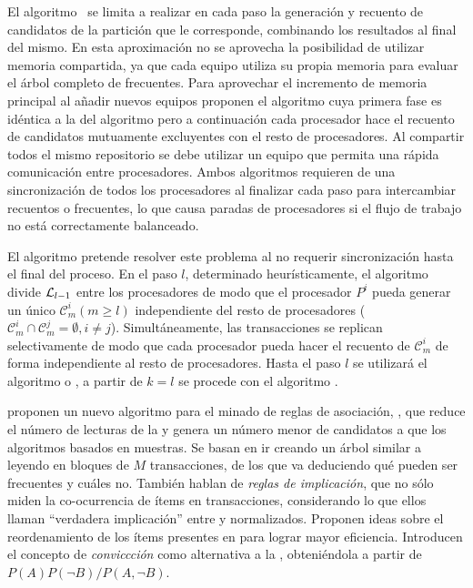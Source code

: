 El algoritmo~%
 se limita a realizar en cada paso la generación y recuento de candidatos de la partición que le corresponde, combinando los resultados al final del mismo. En esta aproximación no se aprovecha la posibilidad de utilizar memoria compartida, ya que cada equipo utiliza su propia memoria para evaluar el árbol completo de \itemsets frecuentes. Para aprovechar el incremento de memoria principal al añadir nuevos equipos proponen el algoritmo  cuya primera fase es idéntica a la del algoritmo  pero a continuación cada procesador hace el recuento de candidatos mutuamente excluyentes con el resto de procesadores. Al compartir todos el mismo repositorio \D se debe utilizar un equipo que permita una rápida comunicación entre procesadores. Ambos algoritmos requieren de una sincronización de todos los procesadores al finalizar cada paso para intercambiar recuentos o \itemsets frecuentes, lo que causa paradas de procesadores si el flujo de trabajo no está correctamente balanceado.

El algoritmo  pretende resolver este problema al no requerir sincronización hasta el final del proceso. En el paso $l$, determinado heurísticamente, el algoritmo divide $\aprioriL[l-1]$ entre los procesadores de modo que el procesador $P^i$ pueda generar un único $\mathcal{C}_m^i (m\geq l)$ independiente del resto de procesadores ($\mathcal{C}_m^i \cap \mathcal{C}_m^j = \emptyset, i\neq j$). Simultáneamente, las transacciones se replican selectivamente de modo que cada procesador pueda hacer el recuento de $\mathcal{C}_m^i$ de forma independiente al resto de procesadores. Hasta el paso $l$ se utilizará el algoritmo  o , a partir de $k=l$ se procede con el algoritmo .





\citet{BrinMotwaniUllmanTsur-DynamicItemsetCounting-1997} proponen un nuevo algoritmo para el minado de reglas de asociación, , que reduce el número de lecturas de la \db y genera un número menor de candidatos a \itemset que los algoritmos basados en muestras. Se basan en ir creando un árbol similar a \aprioriL leyendo \D en bloques de $M$ transacciones, de los que va deduciendo qué \itemsets pueden ser frecuentes y cuáles no. También hablan de \textsl{reglas de implicación}, que no sólo miden la co-ocurrencia de ítems en transacciones, considerando lo que ellos llaman "`verdadera implicación"' entre \antecedentes y \consecuentes normalizados. Proponen ideas sobre el reordenamiento de los ítems presentes en \D para lograr mayor eficiencia. Introducen el concepto de \textsl{conviccción} como alternativa a la \confianza, obteniéndola a partir de $P(A)P(\neg B) / P(A,\neg B)$.


